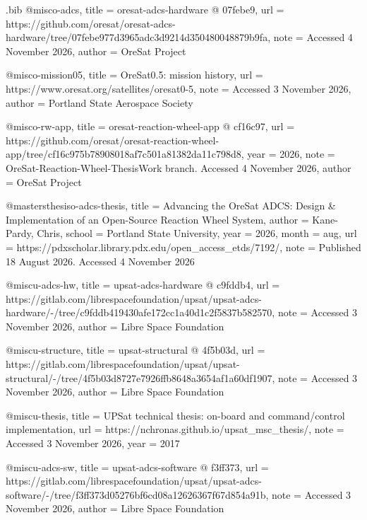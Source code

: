 \begin{filecontents*}[overwrite]{\jobname.bib}
@misc{o-adcs,
  title = {{oresat-\allowbreak{}adcs-\allowbreak{}hardware @ 07febe9}},
  url = {https://github.com/oresat/oresat-adcs-hardware/tree/07febe977d3965adc3d9214d350480048879b9fa},
  note = {Accessed 4 November 2026},
  author = {{OreSat Project}}
}

@misc{o-mission05,
  title = {{OreSat0.5: mission history}},
  url = {https://www.oresat.org/satellites/oresat0-5},
  note = {Accessed 3 November 2026},
  author = {{Portland State Aerospace Society}}
}

@misc{o-rw-app,
  title = {{oresat-\allowbreak{}reaction-\allowbreak{}wheel-\allowbreak{}app @ cf16c97}},
  url = {https://github.com/oresat/oresat-reaction-wheel-app/tree/cf16c975b78908018af7c501a81382da11c798d8},
  year = {2026},
  note = {OreSat-Reaction-Wheel-ThesisWork branch. Accessed 4 November 2026},
  author = {{OreSat Project}}
}

@mastersthesis{o-adcs-thesis,
  title = {{Advancing the OreSat ADCS: Design \& Implementation of an Open-\allowbreak{}Source Reaction Wheel System}},
  author = {Kane-Pardy, Chris},
  school = {Portland State University},
  year = {2026},
  month = aug,
  url = {https://pdxscholar.library.pdx.edu/open_access_etds/7192/},
  note = {Published 18 August 2026. Accessed 4 November 2026}
}

@misc{u-adcs-hw,
  title = {{upsat-\allowbreak{}adcs-\allowbreak{}hardware @ c9fddb4}},
  url = {https://gitlab.com/librespacefoundation/upsat/upsat-adcs-hardware/-/tree/c9fddb419430afe172cc1a40d1c2f5837b582570},
  note = {Accessed 3 November 2026},
  author = {{Libre Space Foundation}}
}

@misc{u-structure,
  title = {{upsat-\allowbreak{}structural @ 4f5b03d}},
  url = {https://gitlab.com/librespacefoundation/upsat/upsat-structural/-/tree/4f5b03d8727e7926ffb8648a3654af1a60df1907},
  note = {Accessed 3 November 2026},
  author = {{Libre Space Foundation}}
}

@misc{u-thesis,
  title = {{UPSat technical thesis: on-\allowbreak{}board and command/\allowbreak{}control implementation}},
  url = {https://nchronas.github.io/upsat_msc_thesis/},
  note = {Accessed 3 November 2026},
  year = {2017}
}

@misc{u-adcs-sw,
  title = {{upsat-\allowbreak{}adcs-\allowbreak{}software @ f3ff373}},
  url = {https://gitlab.com/librespacefoundation/upsat/upsat-adcs-software/-/tree/f3ff373d05276bf6cd08a12626367f67d854a91b},
  note = {Accessed 3 November 2026},
  author = {{Libre Space Foundation}}
}


\end{filecontents*}
